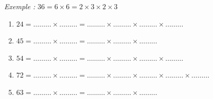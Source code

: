 \documentclass[11pt]{article}
\begin{document}
\phantom{0}


\begin{center}
\brouillon
\soin
\recherche 
{}
\end{center}

\begin{exercicedevoir}
\textit{Exemple :} $36 = 6 \times 6 = 2 \times 3 \times 2 \times 3$
\begin{enumerate}
\item $24 = \ldots\ldots\ldots \times \ldots\ldots\ldots = \ldots\ldots\ldots \times \ldots\ldots\ldots \times \ldots\ldots\ldots \times \ldots\ldots\ldots $
\item $45 = \ldots\ldots\ldots \times \ldots\ldots\ldots = \ldots\ldots\ldots \times \ldots\ldots\ldots \times \ldots\ldots\ldots $
\item $54 = \ldots\ldots\ldots \times \ldots\ldots\ldots = \ldots\ldots\ldots \times \ldots\ldots\ldots \times \ldots\ldots\ldots \times \ldots\ldots\ldots$
\item $72 = \ldots\ldots\ldots \times \ldots\ldots\ldots = \ldots\ldots\ldots \times \ldots\ldots\ldots \times \ldots\ldots\ldots \times \ldots\ldots\ldots \times \ldots\ldots\ldots$
\item $63 = \ldots\ldots\ldots \times \ldots\ldots\ldots = \ldots\ldots\ldots \times \ldots\ldots\ldots \times \ldots\ldots\ldots $
\end{enumerate}
\end{exercicedevoir}
\end{document}
